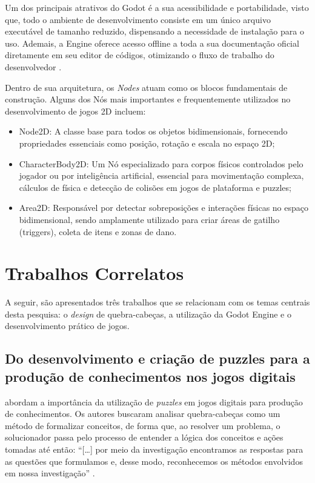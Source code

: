 Um dos principais atrativos do Godot é a sua acessibilidade e portabilidade, visto que, todo o ambiente de desenvolvimento consiste em um único arquivo executável de tamanho reduzido, dispensando a necessidade de instalação para o uso. Ademais, a Engine oferece acesso offline a toda a sua documentação oficial diretamente em seu editor de códigos, otimizando o fluxo de trabalho do desenvolvedor \cite{Godot2026}.

Dentro de sua arquitetura, os \textit{Nodes} atuam como os blocos fundamentais de construção. Alguns dos Nós mais importantes e frequentemente utilizados no desenvolvimento de jogos 2D incluem:
\begin{itemize}

\item Node2D: A classe base para todos os objetos bidimensionais, fornecendo propriedades essenciais como posição, rotação e escala no espaço 2D;
\item CharacterBody2D: Um Nó especializado para corpos físicos controlados pelo jogador ou por inteligência artificial, essencial para movimentação complexa, cálculos de física e detecção de colisões em jogos de plataforma e puzzles;
\item Area2D: Responsável por detectar sobreposições e interações físicas no espaço bidimensional, sendo amplamente utilizado para criar áreas de gatilho (triggers), coleta de itens e zonas de dano.
\end{itemize}

\section{Trabalhos Correlatos}

A seguir, são apresentados três trabalhos que se relacionam com os temas centrais desta pesquisa: o \textit{design} de quebra-cabeças, a utilização da Godot Engine e o desenvolvimento prático de jogos.

\subsection{Do desenvolvimento e criação de puzzles para a produção de conhecimentos nos jogos digitais}

 abordam a importância da utilização de \textit{puzzles} em jogos digitais para produção de conhecimentos. Os autores buscaram analisar quebra-cabeças como um método de formalizar conceitos, de forma que, ao resolver um problema, o solucionador passa pelo processo de entender a lógica dos conceitos e ações tomadas até então: ``[\dots] por meio da investigação encontramos as respostas para as questões que formulamos e, desse modo, reconhecemos os métodos envolvidos em nossa investigação'' \cite[p. 99]{Toneis2015}.

